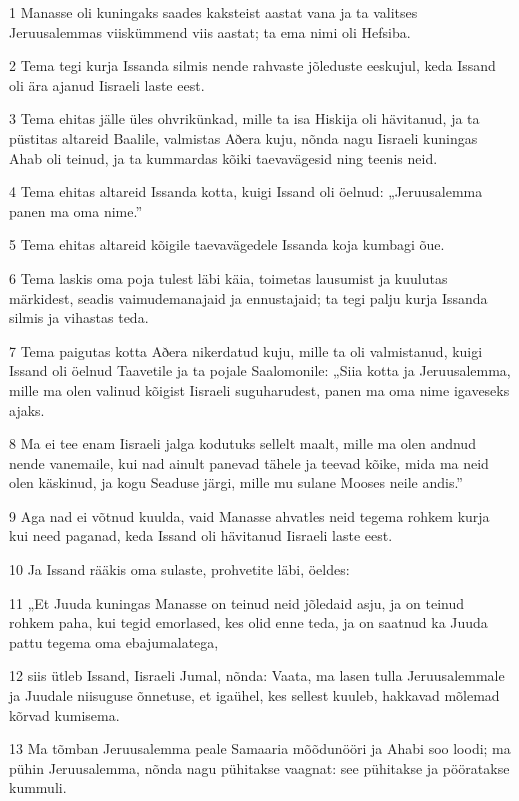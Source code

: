 \par 1 Manasse oli kuningaks saades kaksteist aastat vana ja ta valitses Jeruusalemmas viiskümmend viis aastat; ta ema nimi oli Hefsiba.
\par 2 Tema tegi kurja Issanda silmis nende rahvaste jõleduste eeskujul, keda Issand oli ära ajanud Iisraeli laste eest.
\par 3 Tema ehitas jälle üles ohvrikünkad, mille ta isa Hiskija oli hävitanud, ja ta püstitas altareid Baalile, valmistas Aðera kuju, nõnda nagu Iisraeli kuningas Ahab oli teinud, ja ta kummardas kõiki taevavägesid ning teenis neid.
\par 4 Tema ehitas altareid Issanda kotta, kuigi Issand oli öelnud: „Jeruusalemma panen ma oma nime.”
\par 5 Tema ehitas altareid kõigile taevavägedele Issanda koja kumbagi õue.
\par 6 Tema laskis oma poja tulest läbi käia, toimetas lausumist ja kuulutas märkidest, seadis vaimudemanajaid ja ennustajaid; ta tegi palju kurja Issanda silmis ja vihastas teda.
\par 7 Tema paigutas kotta Aðera nikerdatud kuju, mille ta oli valmistanud, kuigi Issand oli öelnud Taavetile ja ta pojale Saalomonile: „Siia kotta ja Jeruusalemma, mille ma olen valinud kõigist Iisraeli suguharudest, panen ma oma nime igaveseks ajaks.
\par 8 Ma ei tee enam Iisraeli jalga kodutuks sellelt maalt, mille ma olen andnud nende vanemaile, kui nad ainult panevad tähele ja teevad kõike, mida ma neid olen käskinud, ja kogu Seaduse järgi, mille mu sulane Mooses neile andis.”
\par 9 Aga nad ei võtnud kuulda, vaid Manasse ahvatles neid tegema rohkem kurja kui need paganad, keda Issand oli hävitanud Iisraeli laste eest.
\par 10 Ja Issand rääkis oma sulaste, prohvetite läbi, öeldes:
\par 11 „Et Juuda kuningas Manasse on teinud neid jõledaid asju, ja on teinud rohkem paha, kui tegid emorlased, kes olid enne teda, ja on saatnud ka Juuda pattu tegema oma ebajumalatega,
\par 12 siis ütleb Issand, Iisraeli Jumal, nõnda: Vaata, ma lasen tulla Jeruusalemmale ja Juudale niisuguse õnnetuse, et igaühel, kes sellest kuuleb, hakkavad mõlemad kõrvad kumisema.
\par 13 Ma tõmban Jeruusalemma peale Samaaria mõõdunööri ja Ahabi soo loodi; ma pühin Jeruusalemma, nõnda nagu pühitakse vaagnat: see pühitakse ja pööratakse kummuli.

